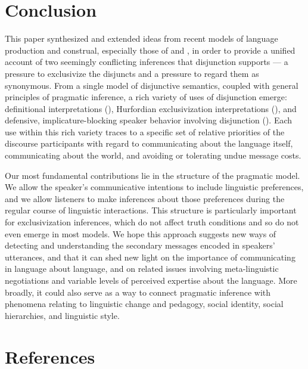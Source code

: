 \documentclass[12pt,twoside]{article}
\renewcommand{\_}{\textbf{\textunderscore\hspace{-4pt}\textunderscore\hspace{-3pt}\textunderscore\hspace{-4pt}\textunderscore}\hspace{0.5pt}}			%
\begin{document}

\section{Conclusion}\label{sec:conclusion}

This paper synthesized and extended ideas from recent models of
language production and construal, especially those of
\citet{Smith:Goodman:Frank:2013} and \citet{bergen-levy-goodman:2014},
in order to provide a unified account of two seemingly conflicting
inferences that disjunction supports --- a pressure to exclusivize the
disjuncts and a pressure to regard them as synonymous.  From a single
model of disjunctive semantics, coupled with general principles of
pragmatic inference, a rich variety of uses of disjunction emerge:
definitional interpretations (),
Hurfordian exclusivization interpretations
(), and defensive,
implicature-blocking speaker behavior involving disjunction 
().  Each use within this rich variety
traces to a specific set of relative priorities of the discourse
participants with regard to communicating about the language itself,
communicating about the world, and avoiding or tolerating undue
message costs.

Our most fundamental contributions lie in the structure of the
pragmatic model. We allow the speaker's communicative intentions to
include linguistic preferences, and we allow listeners to make
inferences about those preferences during the regular course of
linguistic interactions. This structure is particularly important for
exclusivization inferences, which do not affect truth conditions and
so do not even emerge in most models.  We hope this approach suggests
new ways of detecting and understanding the secondary messages encoded
in speakers' utterances, and that it can shed new light on the
importance of communicating in language about language, and on related
issues involving meta-linguistic negotiations and variable levels of
perceived expertise about the language. More broadly, it could also
serve as a way to connect pragmatic inference with phenomena relating
to linguistic change and pedagogy, social identity, social
hierarchies, and linguistic style.


\section{References}


\end{document}
